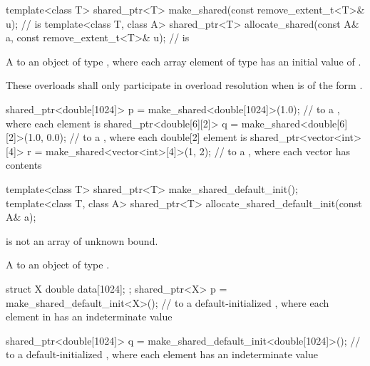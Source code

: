 %
%
\begin{itemdecl}
template<class T>
  shared_ptr<T> make_shared(const remove_extent_t<T>& u);       //  is 
template<class T, class A>
  shared_ptr<T> allocate_shared(const A& a,
                                const remove_extent_t<T>& u);   //  is 
\end{itemdecl}

\begin{itemdescr}
\pnum
\returns A  to an object of type ,
where each array element of type 
has an initial value of .

\pnum
\remarks These overloads shall only participate in overload resolution
when  is of the form .

\pnum
\begin{example}
\begin{codeblock}
shared_ptr<double[1024]> p = make_shared<double[1024]>(1.0);
  //  to a , where each element is 
shared_ptr<double[6][2]> q = make_shared<double[6][2]>({1.0, 0.0});
  //  to a , where each double[2] element is 
shared_ptr<vector<int>[4]> r = make_shared<vector<int>[4]>({1, 2});
  //  to a , where each vector has contents 
\end{codeblock}
\end{example}
\end{itemdescr}

%
%
\begin{itemdecl}
template<class T>
  shared_ptr<T> make_shared_default_init();
template<class T, class A>
  shared_ptr<T> allocate_shared_default_init(const A& a);
\end{itemdecl}

\begin{itemdescr}
\pnum
\constraints
{} is not an array of unknown bound.

\pnum
\returns
A  to an object of type .

\pnum
\begin{example}
\begin{codeblock}
struct X { double data[1024]; };
shared_ptr<X> p = make_shared_default_init<X>();
  //  to a default-initialized , where each element in  has an indeterminate value

shared_ptr<double[1024]> q = make_shared_default_init<double[1024]>();
  //  to a default-initialized , where each element has an indeterminate value
\end{codeblock}
\end{example}
\end{itemdescr}


